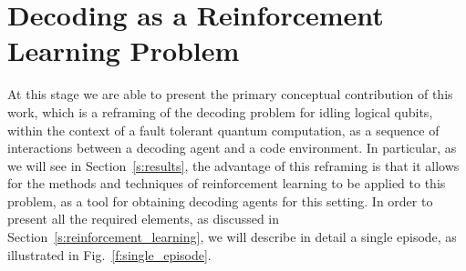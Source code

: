 \documentclass[twocolumn,preprintnumbers,amsmath,amssymb,notitlepage,nofootinbib,longbibliography,superscriptaddress,aps,pra,10pt]{revtex4-1}
\begin{document}
\section{Decoding as a Reinforcement Learning Problem}\label{s:decoding_as_rl}

	At this stage we are able to present the primary conceptual contribution of this work, which is a reframing of the decoding problem for idling logical qubits, within the context of a fault tolerant quantum computation, as a sequence of interactions between a decoding agent and a code environment.
	In particular, as we will see in Section~\ref{s:results}, the advantage of this reframing is that it allows for the methods and techniques of reinforcement learning to be applied to this problem, as a tool for obtaining decoding agents for this setting.
	In order to present all the required elements, as discussed in Section~\ref{s:reinforcement_learning}, we will describe in detail a single episode, as illustrated in Fig.~\ref{f:single_episode}.
\end{document}
